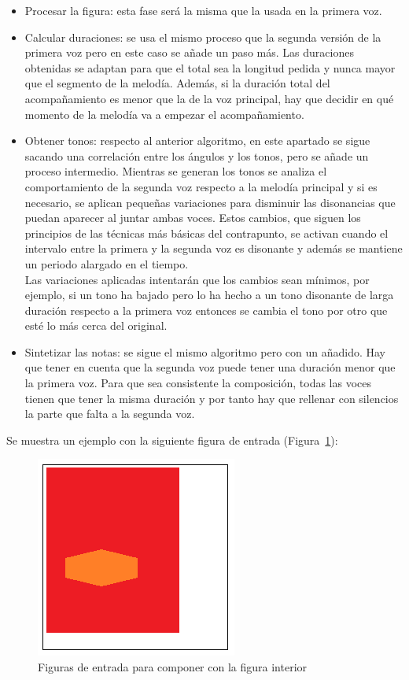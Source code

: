 \begin{itemize}
	\item Procesar la figura: esta fase será la misma que la usada en la primera voz.

	\item Calcular duraciones: se usa el mismo proceso que la segunda versión de la primera voz pero en este caso se añade un paso más. Las duraciones obtenidas se adaptan para que el total sea la longitud pedida y nunca mayor que el segmento de la melodía. Además, si la duración total del acompañamiento es menor que la de la voz principal, hay que decidir en qué momento de la melodía va a empezar el acompañamiento.

	\item Obtener tonos: respecto al anterior algoritmo, en este apartado se sigue sacando una correlación entre los ángulos y los tonos, pero se añade un proceso intermedio. Mientras se generan los tonos se analiza el comportamiento de la segunda voz respecto a la melodía principal y si es necesario, se aplican pequeñas variaciones para disminuir las disonancias que puedan aparecer al juntar ambas voces. Estos cambios, que siguen los principios de las técnicas más básicas del contrapunto, se activan cuando el intervalo entre la primera y la segunda voz es disonante y además se mantiene un periodo alargado en el tiempo. \\
Las variaciones aplicadas intentarán que los cambios sean mínimos, por ejemplo, si un tono ha bajado pero lo ha hecho a un tono disonante de larga duración respecto a la primera voz entonces se cambia el tono por otro que esté lo más cerca del original.

	\item Sintetizar las notas: se sigue el mismo algoritmo pero con un añadido. Hay que tener en cuenta que la segunda voz puede tener una duración menor que la primera voz. Para que sea consistente la composición, todas las voces tienen que tener la misma duración y por tanto hay que rellenar con silencios la parte que falta a la segunda voz.

\end{itemize}

Se muestra un ejemplo con la siguiente figura de entrada (Figura~\ref{fig:Figura0Voz2}):

		\begin{figure}[!htbp]
		\centering
		\hspace*{0.0in}
		\includegraphics[scale=1]{graphics/simpletest4.png}
		\caption{Figuras de entrada para componer con la figura interior}
		\label{fig:Figura0Voz2}
		\end{figure}


